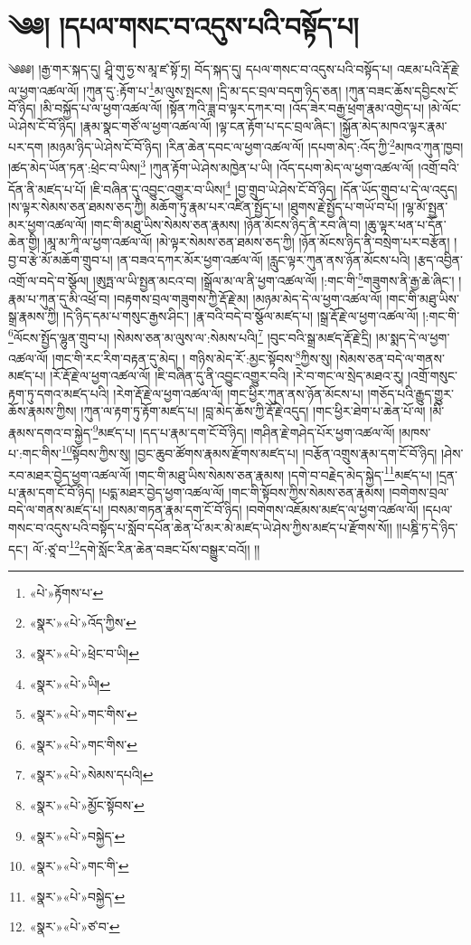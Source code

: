\chapter{༄༅། །དཔལ་གསང་བ་འདུས་པའི་བསྟོད་པ།}༄༅༅། །རྒྱ་གར་སྐད་དུ། ཤྲཱི་གུ་ཧྱ་ས་མཱ་ཛ་སྟོ་ཏྲ། བོད་སྐད་དུ། དཔལ་གསང་བ་འདུས་པའི་བསྟོད་པ། འཇམ་པའི་རྡོ་རྗེ་ལ་ཕྱག་འཚལ་ལོ། །ཀུན་དུ་:རྟོག་པ་\footnote{«པེ་»རྟོགས་པ་}མ་ལུས་སྤངས། །དྲི་མ་དང་བྲལ་བདག་ཉིད་ཅན། །ཀུན་བཟང་ཆོས་དབྱིངས་ངོ་བོ་ཉིད། །མི་བསྐྱོད་པ་ལ་ཕྱག་འཚལ་ལོ། །སྟོན་ཀའི་ཟླ་བ་ལྟར་དཀར་བ། །འོད་ཟེར་བརྒྱ་ཕྲག་རྣམ་འགྱེད་པ། །མེ་ལོང་ཡེ་ཤེས་ངོ་བོ་ཉིད། །རྣམ་སྣང་གཙོ་ལ་ཕྱག་འཚལ་ལོ། །ལྟ་ངན་རྟོག་པ་དང་བྲལ་ཞིང་། །སྐྱོན་མེད་མཁའ་ལྟར་རྣམ་པར་དག །མཉམ་ཉིད་ཡེ་ཤེས་ངོ་བོ་ཉིད། །རིན་ཆེན་དབང་ལ་ཕྱག་འཚལ་ལོ། །དཔག་མེད་:འོད་ཀྱི་\footnote{«སྣར་»«པེ་»འོད་ཀྱིས་}མཁའ་ཀུན་ཁྱབ། །ཚད་མེད་ཡོན་ཏན་:ཕྲེང་བ་ཡིས།\footnote{«སྣར་»«པེ་»ཕྲེང་བ་ཡི།} །ཀུན་རྟོག་ཡེ་ཤེས་མཁྱེན་པ་ཡི། །འོད་དཔག་མེད་ལ་ཕྱག་འཚལ་ལོ། །འགྲོ་བའི་དོན་ནི་མཛད་པ་པོ། །ཇི་བཞིན་དུ་འབྱུང་འགྱུར་བ་ཡིས།\footnote{«སྣར་»«པེ་»ཡི།} །བྱ་གྲུབ་ཡེ་ཤེས་ངོ་བོ་ཉིད། །དོན་ཡོད་གྲུབ་པ་དེ་ལ་འདུད། །ས་ལྟར་སེམས་ཅན་ཐམས་ཅད་ཀྱི། མཆོག་ཏུ་རྣམ་པར་འཛིན་སྤྱོད་པ། །ཐུགས་རྗེ་སྤྱོད་པ་གཡོ་བ་པོ། །ལྷ་མོ་སྤྱན་མར་ཕྱག་འཚལ་ལོ། །གང་གི་མཐུ་ཡིས་སེམས་ཅན་རྣམས། །ཉོན་མོངས་ཉིད་ནི་རབ་ཞི་བ། །ཆུ་ལྟར་ཕན་པ་དོན་ཆེན་གྱི། །མཱ་མ་ཀཱི་ལ་ཕྱག་འཚལ་ལོ། །མེ་ལྟར་སེམས་ཅན་ཐམས་ཅད་ཀྱི། །ཉོན་མོངས་ཉིད་ནི་བསྲེག་པར་བརྩོན། །བྱ་བ་རྩེ་མོ་མཆོག་གྲུབ་པ། །ན་བཟའ་དཀར་མོར་ཕྱག་འཚལ་ལོ། །རླུང་ལྟར་ཀུན་ནས་ཉོན་མོངས་པའི། །རྩད་འབྱིན་འགྲོ་ལ་བདེ་བ་སྩོལ། །ཨུཏྤ་ལ་ཡི་སྤྱན་མངའ་བ། །སྒྲོལ་མ་ལ་ནི་ཕྱག་འཚལ་ལོ། །:གང་གི་\footnote{«སྣར་»«པེ་»གང་གིས་}གཟུགས་ནི་རྒྱ་ཆེ་ཞིང་། །རྣམ་པ་ཀུན་དུ་མི་འཕྲོ་བ། །བརྟགས་བྲལ་གཟུགས་ཀྱི་རྡོ་རྗེ་མ། །མཉམ་མེད་དེ་ལ་ཕྱག་འཚལ་ལོ། །གང་གི་མཐུ་ཡིས་སྒྲ་རྣམས་ཀྱི། །དེ་ཉིད་དམ་པ་གསུང་རྒྱས་ཤིང་། །རྣ་བའི་བདེ་བ་སྩོལ་མཛད་པ། །སྒྲ་རྡོ་རྗེ་ལ་ཕྱག་འཚལ་ལོ། །:གང་གི་\footnote{«སྣར་»«པེ་»གང་གིས་}ལོངས་སྤྱོད་ལྷུན་གྲུབ་པ། །སེམས་ཅན་མ་ལུས་ལ་:སེམས་པའི།\footnote{«སྣར་»«པེ་»སེམས་དཔའི།} །བུང་བའི་སྒྲ་མཛད་རྡོ་རྗེ་དྲི། །མ་སྨད་དེ་ལ་ཕྱག་འཚལ་ལོ། །གང་གི་རང་རིག་བརྟན་དུ་མེད། །
གཉིས་མེད་རོ་:མྱང་སྟོབས་\footnote{«སྣར་»«པེ་»མྱོང་སྟོབས་}ཀྱིས་སུ། །སེམས་ཅན་བདེ་ལ་གནས་མཛད་པ། །རོ་རྡོ་རྗེ་ལ་ཕྱག་འཚལ་ལོ། །ཇི་བཞིན་དུ་ནི་འབྱུང་འགྱུར་བའི། །རེ་བ་གང་ལ་སྲེད་མཐའ་རུ། །འགྲོ་གསུང་རྟག་ཏུ་དགའ་མཛད་པའི། །རེག་རྡོ་རྗེ་ལ་ཕྱག་འཚལ་ལོ། །གང་ཕྱིར་ཀུན་ནས་ཉོན་མོངས་པ། །གཅོད་པའི་རྒྱུད་གྱུར་ཆོས་རྣམས་ཀྱིས། །ཀུན་ལ་རྟག་ཏུ་རྟོག་མཛད་པ། །བླ་མེད་ཆོས་ཀྱི་རྡོ་རྗེ་འདུད། །གང་ཕྱིར་ཐེག་པ་ཆེན་པོ་ལ། །མི་རྣམས་དགའ་བ་སྐྱེད་\footnote{«སྣར་»«པེ་»བསྐྱེད་}མཛད་པ། །དད་པ་རྣམ་དག་ངོ་བོ་ཉིད། །གཤིན་རྗེ་གཤེད་པོར་ཕྱག་འཚལ་ལོ། །མཁས་པ་:གང་གིས་\footnote{«སྣར་»«པེ་»གང་གི་}སྟོབས་ཀྱིས་སུ། །བྱང་ཆུབ་ཚོགས་རྣམས་རྫོགས་མཛད་པ། །བརྩོན་འགྲུས་རྣམ་དག་ངོ་བོ་ཉིད། །ཤེས་རབ་མཐར་བྱེད་ཕྱག་འཚལ་ལོ། །གང་གི་མཐུ་ཡིས་སེམས་ཅན་རྣམས། །དགེ་བ་བརྗེད་མེད་སྐྱེད་\footnote{«སྣར་»«པེ་»བསྐྱེད་}མཛད་པ། །དྲན་པ་རྣམ་དག་ངོ་བོ་ཉིད། །པདྨ་མཐར་བྱེད་ཕྱག་འཚལ་ལོ། །གང་གི་སྟོབས་ཀྱིས་སེམས་ཅན་རྣམས། །བགེགས་བྲལ་བདེ་ལ་གནས་མཛད་པ། །བསམ་གཏན་རྣམ་དག་ངོ་བོ་ཉིད། །བགེགས་འཇོམས་མཛད་ལ་ཕྱག་འཚལ་ལོ། །དཔལ་གསང་བ་འདུས་པའི་བསྟོད་པ་སློབ་དཔོན་ཆེན་པོ་མར་མེ་མཛད་ཡེ་ཤེས་ཀྱིས་མཛད་པ་རྫོགས་སོ།། །།པཎྜི་ཏ་དེ་ཉིད་དང་། ལོ་:ཙཱ་བ་\footnote{«སྣར་»«པེ་»ཙ་བ་}དགེ་སློང་རིན་ཆེན་བཟང་པོས་བསྒྱུར་བའོ།། །།